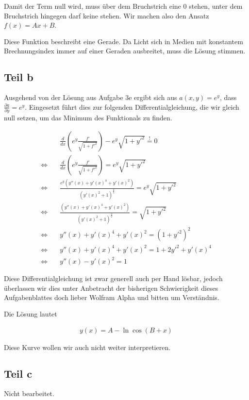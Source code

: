 \documentclass[a4paper,german,12pt,smallheadings]{scrartcl}
\begin{document}
Damit der Term null wird, muss über dem Bruchstrich eine $0$ stehen, unter dem
Bruchstrich hingegen darf keine stehen. Wir machen also den Ansatz $f(x) =
Ax+B$.

Diese Funktion beschreibt eine Gerade. Da Licht sich in Medien mit konstantem
Brechnungsindex immer auf einer Geraden ausbreitet, muss die Lösung stimmen.

\subsection*{Teil b}

Ausgehend von der Lösung aus Aufgabe 3e ergibt sich aus $a(x,y) = e^y$, dass
$\frac{\partial a}{\partial y} = e^y$. Eingesetzt führt dies zur
folgenden Differentialgleichung, die wir gleich null setzen, um das Minimum des
Funktionals zu finden.

\begin{align*}
  &\frac{d}{dx} \left(e^y \frac{f'}{\sqrt{1+f'^2}} \right) - e^y \sqrt{1+y'^2} \overset{!}{=} 0 \\
  \Leftrightarrow \quad &\frac{d}{dx} \left(e^y \frac{f'}{\sqrt{1+f'^2}} \right) = e^y \sqrt{1+y'^2} \\
  \Leftrightarrow \quad &\frac{e^y \left(y''(x) + y'(x)^4 + y'(x)^2\right)}{(y'(x)^2 + 1)^\frac{3}{2}} = e^y \sqrt{1+y'^2} \\
  \Leftrightarrow \quad &\frac{\left(y''(x) + y'(x)^4 + y'(x)^2\right)}{(y'(x)^2 + 1)^\frac{3}{2}} = \sqrt{1+y'^2} \\
  \Leftrightarrow \quad &y''(x) + y'(x)^4 + y'(x)^2 = \left(1+y'^2\right)^2 \\
  \Leftrightarrow \quad &y''(x) + y'(x)^4 + y'(x)^2 = 1+2y'^2+y'(x)^4 \\
  \Leftrightarrow \quad &y''(x) - y'(x)^2 = 1
\end{align*}

Diese Differentialgleichung ist zwar generell auch per Hand lösbar, jedoch
überlassen wir dies unter Anbetracht der bisherigen Schwierigkeit dieses
Aufgabenblattes doch lieber Wolfram Alpha und bitten um Verständnis.

Die Lösung lautet

\begin{align*}
  y(x) = A - \ln \cos\left(B + x\right)
\end{align*}

Diese Kurve wollen wir auch nicht weiter interpretieren.

\subsection*{Teil c}
Nicht bearbeitet.
\end{document}
